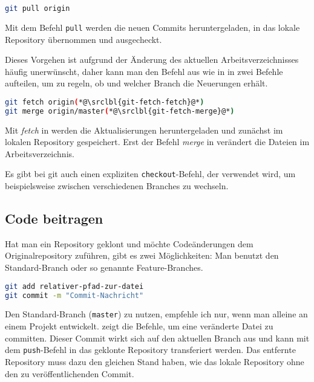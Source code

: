 \begin{lstlisting}[language=sh,caption={Mit git \emph{pull} auf Originalrepository ausführen},label=\lstlbl{git-pull}]
git pull origin
\end{lstlisting}

Mit dem Befehl \texttt{pull} werden die neuen Commits heruntergeladen, in das lokale Repository übernommen und ausgecheckt.

Dieses Vorgehen ist aufgrund der Änderung des aktuellen Arbeitsverzeichnisses häufig unerwünscht, daher kann man den Befehl aus  wie in  in zwei Befehle aufteilen, um zu regeln, ob und welcher Branch die Neuerungen erhält.

\begin{lstlisting}[language=sh,caption={\emph{pull} in zwei Befehlen manuell ausführen},label=\lstlbl{git-fetch-merge}]
git fetch origin(*@\srclbl{git-fetch-fetch}@*)
git merge origin/master(*@\srclbl{git-fetch-merge}@*)
\end{lstlisting}

Mit \emph{fetch} in  werden die Aktualisierungen heruntergeladen und zunächst im lokalen Repository gespeichert. Erst der Befehl \emph{merge} in  verändert die Dateien im Arbeitsverzeichnis.

Es gibt bei \gls{git} auch einen expliziten \texttt{checkout}-Befehl, der verwendet wird, um beispielsweise zwischen verschiedenen Branches zu wechseln.

\subsection{Code beitragen}
Hat man ein Repository geklont und möchte Codeänderungen dem Originalrepository zuführen, gibt es zwei Möglichkeiten: Man benutzt den Standard-Branch oder so genannte Feature-Branches.

\begin{lstlisting}[language=sh,caption={Eine Datei mit git committen},label=\lstlbl{git-commit}]
git add relativer-pfad-zur-datei
git commit -m "Commit-Nachricht"
\end{lstlisting}

Den Standard-Branch (\texttt{master}) zu nutzen, empfehle ich nur, wenn man alleine an einem Projekt entwickelt.  zeigt die Befehle, um eine veränderte Datei zu committen. Dieser Commit wirkt sich auf den aktuellen Branch aus und kann mit dem \texttt{push}-Befehl in das geklonte Repository transferiert werden. Das entfernte Repository muss dazu den gleichen Stand haben, wie das lokale Repository ohne den zu veröffentlichenden Commit.

